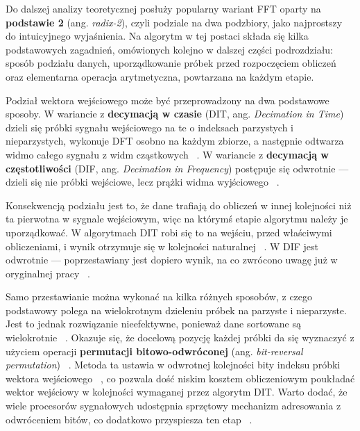 Do dalszej analizy teoretycznej posłuży popularny wariant FFT oparty na \textbf{podstawie 2} (ang. \textit{radix-2}), czyli podziale na dwa podzbiory, jako najprostszy do intuicyjnego wyjaśnienia.
Na algorytm w tej postaci składa się kilka podstawowych zagadnień, omówionych kolejno w dalszej części podrozdziału: sposób podziału danych, uporządkowanie próbek przed rozpoczęciem obliczeń oraz elementarna operacja arytmetyczna, powtarzana na każdym etapie.

Podział wektora wejściowego może być przeprowadzony na dwa podstawowe sposoby. W wariancie z \textbf{decymacją w czasie} (DIT, ang. \textit{Decimation in Time}) dzieli się próbki sygnału wejściowego na te o indeksach parzystych i nieparzystych, wykonuje DFT osobno na każdym zbiorze, a następnie odtwarza widmo całego sygnału z widm cząstkowych ~\cite{ZielinskiDSP}. W wariancie z \textbf{decymacją w częstotliwości} (DIF, ang. \textit{Decimation in Frequency}) postępuje się odwrotnie — dzieli się nie próbki wejściowe, lecz prążki widma wyjściowego ~\cite{ZielinskiDSP}.

Konsekwencją podziału jest to, że dane trafiają do obliczeń w innej kolejności niż ta pierwotna w sygnale wejściowym, więc na którymś etapie algorytmu należy je uporządkować. W algorytmach DIT robi się to na wejściu, przed właściwymi obliczeniami, i wynik otrzymuje się w kolejności naturalnej ~\cite{NumericalRecipesC}. W DIF jest odwrotnie — poprzestawiany jest dopiero wynik, na co zwrócono uwagę już w oryginalnej pracy ~\cite{CooleyTurkeyFFT}.

Samo przestawianie można wykonać na kilka różnych sposobów, z czego podstawowy polega na wielokrotnym dzieleniu próbek na parzyste i nieparzyste. Jest to jednak rozwiązanie nieefektywne, ponieważ dane sortowane są wielokrotnie ~\cite{ZielinskiDSP}. Okazuje się, że docelową pozycję każdej próbki da się wyznaczyć z użyciem operacji \textbf{permutacji bitowo-odwróconej} (ang. \textit{bit-reversal permutation}) ~\cite{CormenIntroductionAlgorithms}. Metoda ta ustawia w odwrotnej kolejności bity indeksu próbki wektora wejściowego ~\cite{ZielinskiDSP}, co pozwala dość niskim kosztem obliczeniowym poukładać wektor wejściowy w kolejności wymaganej przez algorytm DIT. Warto dodać, że wiele procesorów sygnałowych udostępnia sprzętowy mechanizm adresowania z odwróceniem bitów, co dodatkowo przyspiesza ten etap ~\cite{ZielinskiDSP}.

